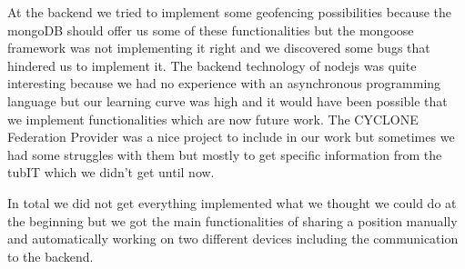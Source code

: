 At the backend we tried to implement some geofencing possibilities because the mongoDB should offer us some of these functionalities but the mongoose framework was not implementing it right and we discovered some bugs that hindered us to implement it. The backend technology of nodejs was quite interesting because we had no experience with an asynchronous programming language but our learning curve was high and it would have been possible that we implement functionalities which are now future work. The CYCLONE Federation Provider was a nice project to include in our work but sometimes we had some struggles with them but mostly to get specific information from the tubIT which we didn't get until now.

In total we did not get everything implemented what we thought we could do at the beginning but we got the main functionalities of sharing a position manually and automatically working on two different devices including the communication to the backend.
